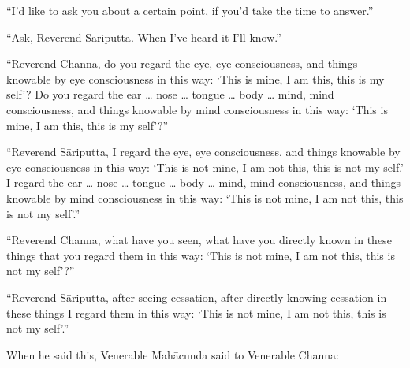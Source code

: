 \documentclass[12pt,openany]{book}%
\begin{document}
“I’d like to ask you about a certain point, if you’d take the time to answer.” 

“Ask, Reverend \textsanskrit{Sāriputta}. When I’ve heard it I’ll know.” 

“Reverend Channa, do you regard the eye, eye consciousness, and things knowable by eye consciousness in this way: ‘This is mine, I am this, this is my self’? Do you regard the ear … nose … tongue … body … mind, mind consciousness, and things knowable by mind consciousness in this way: ‘This is mine, I am this, this is my self’?” 

“Reverend \textsanskrit{Sāriputta}, I regard the eye, eye consciousness, and things knowable by eye consciousness in this way: ‘This is not mine, I am not this, this is not my self.’ I regard the ear … nose … tongue … body … mind, mind consciousness, and things knowable by mind consciousness in this way: ‘This is not mine, I am not this, this is not my self’.” 

“Reverend Channa, what have you seen, what have you directly known in these things that you regard them in this way: ‘This is not mine, I am not this, this is not my self’?” 

“Reverend \textsanskrit{Sāriputta}, after seeing cessation, after directly knowing cessation in these things I regard them in this way: ‘This is not mine, I am not this, this is not my self’.” 

When he said this, Venerable \textsanskrit{Mahācunda} said to Venerable Channa: 
\end{document}

